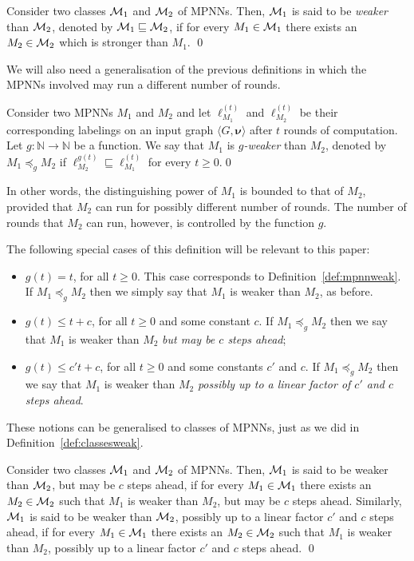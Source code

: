 \begin{definition}\label{def:classesweak}\normalfont
Consider two classes $\mathcal{M}_1$ and $\mathcal{M}_2$ of MPNNs.
Then, $\mathcal{M}_1$ is said to be \textit{weaker} than $\mathcal{M}_2$, denoted by 
$\mathcal{M}_1\sqsubseteq \mathcal{M}_2$, if for every $M_1\in \mathcal{M}_1$
there exists an $M_2\in\mathcal{M}_2$ which is stronger than $M_1$. \qed
\end{definition}

We will also need a generalisation of the previous definitions in which the MPNNs involved may run a different number of rounds. 

\begin{definition}\normalfont
Consider two MPNNs $M_1$ and $M_2$ and let $\pmb{\ell}_{M_1}^{(t)}$ and $\pmb{\ell}_{M_2}^{(t)}$  be their corresponding labelings on an input graph $\langle G,\pmb{\nu}\rangle$ after $t$ rounds of computation. Let $g:\mathbb{N}\to \mathbb{N}$ be a function. We say that $M_1$ is \textit{$g$-weaker} than $M_2$, denoted by $M_1\preceq_{g} M_2$ if 
$\pmb{\ell}_{M_2}^{g(t)}\sqsubseteq
\pmb{\ell}_{M_1}^{(t)}$ for every $t\geq 0$.\qed
\end{definition}
In other words, the distinguishing power of $M_1$ is bounded to that of $M_2$, provided that $M_2$ can run for possibly different number of rounds. The number of rounds that $M_2$ can run, however, is controlled by the function $g$.

The following special cases of this definition will be relevant to this paper:
\begin{itemize}
    \item $g(t)=t$, for all $t\geq 0$. This case corresponds to Definition~\ref{def:mpnnweak}. If $M_1\preceq_{g} M_2$ then we simply say that $M_1$ is weaker than $M_2$, as before.
    \item $g(t)\leq t+c$, for all $t\geq 0$ and some constant $c$. If $M_1\preceq_{g} M_2$ then we say that $M_1$ is weaker than $M_2$ \textit{but may be $c$ steps ahead};
    \item $g(t)\leq c't+c$, for all $t\geq 0$ and some constants $c'$ and $c$. If $M_1\preceq_{g} M_2$ then we say that $M_1$ is weaker than $M_2$ \textit{possibly up to a linear factor of $c'$ and $c$ steps ahead}.
\end{itemize}
These notions can be generalised to classes of MPNNs, just as we did in Definition~\ref{def:classesweak}. 
\begin{definition}\normalfont
Consider two classes $\mathcal{M}_1$ and $\mathcal{M}_2$ of MPNNs.
Then, $\mathcal{M}_1$ is said to be weaker than $\mathcal{M}_2$, but may be $c$ steps ahead, if for every $M_1\in \mathcal{M}_1$
there exists an $M_2\in\mathcal{M}_2$ such that $M_1$ is weaker than $M_2$, but may be $c$ steps ahead. Similarly,
 $\mathcal{M}_1$ is said to be weaker than $\mathcal{M}_2$, possibly up to a linear factor $c'$ and $c$ steps ahead, if for every $M_1\in \mathcal{M}_1$
there exists an $M_2\in\mathcal{M}_2$ such that $M_1$ is weaker than $M_2$, possibly up to a linear factor $c'$ and  $c$ steps ahead. 
\qed
\end{definition}

